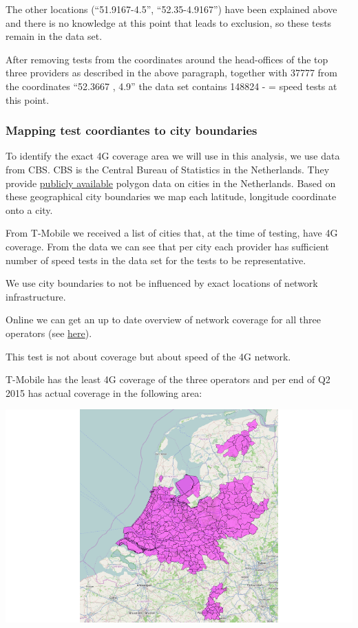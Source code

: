 \documentclass[]{article}
\begin{document}
The other locations (``51.9167-4.5'', ``52.35-4.9167'') have been
explained above and there is no knowledge at this point that leads to
exclusion, so these tests remain in the data set.

After removing tests from the coordinates around the head-offices of the
top three providers as described in the above paragraph, together with
37777 from the coordinates ``52.3667 , 4.9'' the data set contains
148824 - = speed tests at this point.

\subsubsection{Mapping test coordiantes to city
boundaries}\label{mapping-test-coordiantes-to-city-boundaries}

To identify the exact 4G coverage area we will use in this analysis, we
use data from CBS. CBS is the Central Bureau of Statistics in the
Netherlands. They provide
\href{http://www.cbs.nl/nl-NL/menu/themas/dossiers/nederland-regionaal/publicaties/geografische-data/archief/2014/2013-wijk-en-buurtkaart-art.htm}{publicly
available} polygon data on cities in the Netherlands. Based on these
geographical city boundaries we map each latitude, longitude coordinate
onto a city.

From T-Mobile we received a list of cities that, at the time of testing,
have 4G coverage. From the data we can see that per city each provider
has sufficient number of speed tests in the data set for the tests to be
representative.

We use city boundaries to not be influenced by exact locations of
network infrastructure.

Online we can get an up to date overview of network coverage for all
three operators (see \href{http://www.4gdekking.nl/}{here}).

This test is not about coverage but about speed of the 4G network.

T-Mobile has the least 4G coverage of the three operators and per end of
Q2 2015 has actual coverage in the following area:

\includegraphics{speedtest-analysis_files/figure-latex/area-1.pdf}
\end{document}

